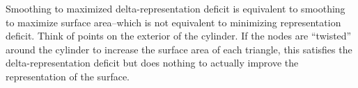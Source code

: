 Smoothing to maximized delta-representation deficit is equivalent to smoothing to maximize surface area--which is not equivalent to minimizing representation deficit. Think of points on the exterior of the cylinder. If the nodes are ``twisted'' around the cylinder to increase the surface area of each triangle, this satisfies the delta-representation deficit but does nothing to actually improve the representation of the surface.
